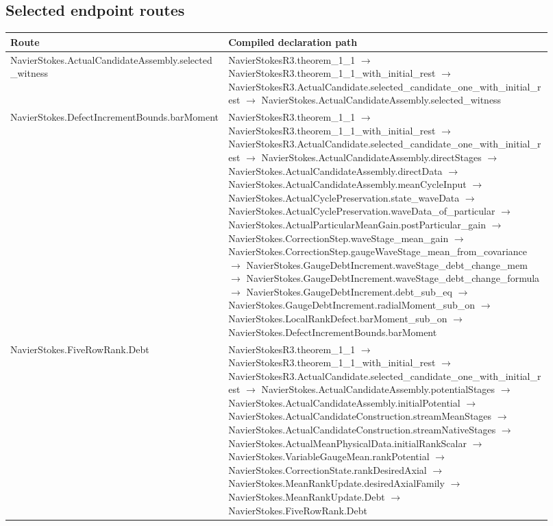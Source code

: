 \subsection{Selected endpoint routes}
\begin{longtable}{p{0.37\linewidth}p{0.55\linewidth}}
Route & Compiled declaration path\\\hline
NavierStokes.ActualCandidateAssembly.selected\_witness & NavierStokesR3.theorem\_1\_1 $\to$ NavierStokesR3.theorem\_1\_1\_with\_initial\_rest $\to$ NavierStokesR3.ActualCandidate.selected\_candidate\_one\_with\_initial\_rest $\to$ NavierStokes.ActualCandidateAssembly.selected\_witness\\
NavierStokes.DefectIncrementBounds.barMoment & NavierStokesR3.theorem\_1\_1 $\to$ NavierStokesR3.theorem\_1\_1\_with\_initial\_rest $\to$ NavierStokesR3.ActualCandidate.selected\_candidate\_one\_with\_initial\_rest $\to$ NavierStokes.ActualCandidateAssembly.directStages $\to$ NavierStokes.ActualCandidateAssembly.directData $\to$ NavierStokes.ActualCandidateAssembly.meanCycleInput $\to$ NavierStokes.ActualCyclePreservation.state\_waveData $\to$ NavierStokes.ActualCyclePreservation.waveData\_of\_particular $\to$ NavierStokes.ActualParticularMeanGain.postParticular\_gain $\to$ NavierStokes.CorrectionStep.waveStage\_mean\_gain $\to$ NavierStokes.CorrectionStep.gaugeWaveStage\_mean\_from\_covariance $\to$ NavierStokes.GaugeDebtIncrement.waveStage\_debt\_change\_mem $\to$ NavierStokes.GaugeDebtIncrement.waveStage\_debt\_change\_formula $\to$ NavierStokes.GaugeDebtIncrement.debt\_sub\_eq $\to$ NavierStokes.GaugeDebtIncrement.radialMoment\_sub\_on $\to$ NavierStokes.LocalRankDefect.barMoment\_sub\_on $\to$ NavierStokes.DefectIncrementBounds.barMoment\\
NavierStokes.FiveRowRank.Debt & NavierStokesR3.theorem\_1\_1 $\to$ NavierStokesR3.theorem\_1\_1\_with\_initial\_rest $\to$ NavierStokesR3.ActualCandidate.selected\_candidate\_one\_with\_initial\_rest $\to$ NavierStokes.ActualCandidateAssembly.potentialStages $\to$ NavierStokes.ActualCandidateAssembly.initialPotential $\to$ NavierStokes.ActualCandidateConstruction.streamMeanStages $\to$ NavierStokes.ActualCandidateConstruction.streamNativeStages $\to$ NavierStokes.ActualMeanPhysicalData.initialRankScalar $\to$ NavierStokes.VariableGaugeMean.rankPotential $\to$ NavierStokes.CorrectionState.rankDesiredAxial $\to$ NavierStokes.MeanRankUpdate.desiredAxialFamily $\to$ NavierStokes.MeanRankUpdate.Debt $\to$ NavierStokes.FiveRowRank.Debt\\

\end{longtable}
